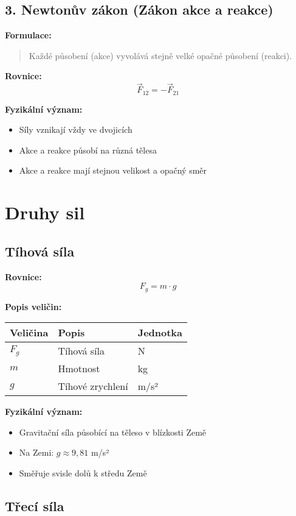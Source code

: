 \documentclass[11pt,a4paper]{article}
\begin{document}
\subsection{3. Newtonův zákon (Zákon akce a reakce)}

\textbf{Formulace:}
\begin{quote}
Každé působení (akce) vyvolává stejně velké opačné působení (reakci).
\end{quote}

\textbf{Rovnice:}
\[\vec{F}_{12} = -\vec{F}_{21}\]

\textbf{Fyzikální význam:}
\begin{itemize}
\item Síly vznikají vždy ve dvojicích
\item Akce a reakce působí na různá tělesa
\item Akce a reakce mají stejnou velikost a opačný směr
\end{itemize}

\clearpage

\section{Druhy sil}

\subsection{Tíhová síla}

\textbf{Rovnice:}
\[F_g = m \cdot g\]

\textbf{Popis veličin:}

\begin{longtable}{lll}
\toprule
Veličina & Popis & Jednotka \\
\midrule
$F_g$ & Tíhová síla & N \\
$m$ & Hmotnost & kg \\
$g$ & Tíhové zrychlení & m/s² \\
\bottomrule
\end{longtable}

\textbf{Fyzikální význam:}
\begin{itemize}
\item Gravitační síla působící na těleso v blízkosti Země
\item Na Zemi: $g \approx 9{,}81$ m/s²
\item Směřuje svisle dolů k středu Země
\end{itemize}

\subsection{Třecí síla}
\end{document}
